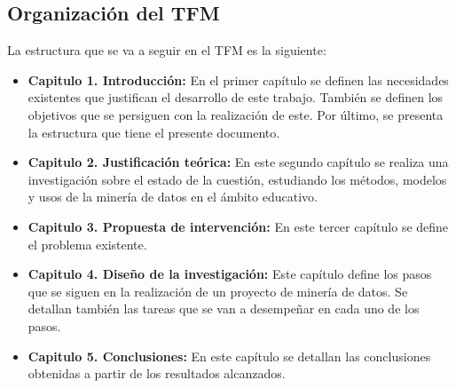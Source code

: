 \subsection{Organización del TFM}
La estructura que se va a seguir en el TFM es la siguiente:
\begin{itemize}
	\item \textbf{Capitulo 1. Introducción:} En el primer capítulo se definen las necesidades existentes que justifican el desarrollo de este trabajo. También se definen los objetivos que se persiguen con la realización de este. Por último, se presenta la estructura que tiene el presente documento.
	\item \textbf{Capitulo 2. Justificación teórica:} En este segundo capítulo se realiza una investigación sobre el estado de la cuestión, estudiando los métodos, modelos y usos de la minería de datos en el ámbito educativo. 
	\item \textbf{Capitulo 3. Propuesta de intervención:} En este tercer capítulo se define el problema existente.
	\item \textbf{Capitulo 4. Diseño de la investigación:} Este capítulo define los pasos que se siguen en la realización de un proyecto de minería de datos. Se detallan también las tareas que se van a desempeñar en cada uno de los pasos.
	\item \textbf{Capitulo 5. Conclusiones:} En este capítulo se detallan las conclusiones obtenidas a partir de los resultados alcanzados.
\end{itemize}




